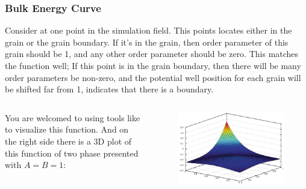 \documentclass[compress,xcolor={dvipsnames}]{beamer}
\newcommand{\bhref}[2]{
    \href{#1}{\color{blue}{#2}}
}
\begin{document}
\begin{frame}
    \frametitle{Bulk Energy Curve}
    Consider at one point in the simulation field. This points locates either in the grain or the grain boundary. If it's in the grain, then order parameter of this grain should be 1, and any other order parameter should be zero. This matches the function well; If this point is in the grain boundary, then there will be many order parameters be non-zero, and the potential well position for each grain will be shifted far from 1, indicates that there is a boundary.

    \begin{columns}
        \begin{column}{.5\linewidth}
            You are welcomed to using tools like \bhref{https://www.desmos.com/calculator?lang=zh-CN}{Desmos} to visualize this function. And on the right side there is a 3D plot of this function of two phase presented with \(A=B=1\):
        \end{column}
        \begin{column}{.4\linewidth}
            \begin{figure}
                \includegraphics[width=\linewidth]{pic/bulk_energy.png}
            \end{figure}
        \end{column}
    \end{columns}


\end{frame}
\end{document}

